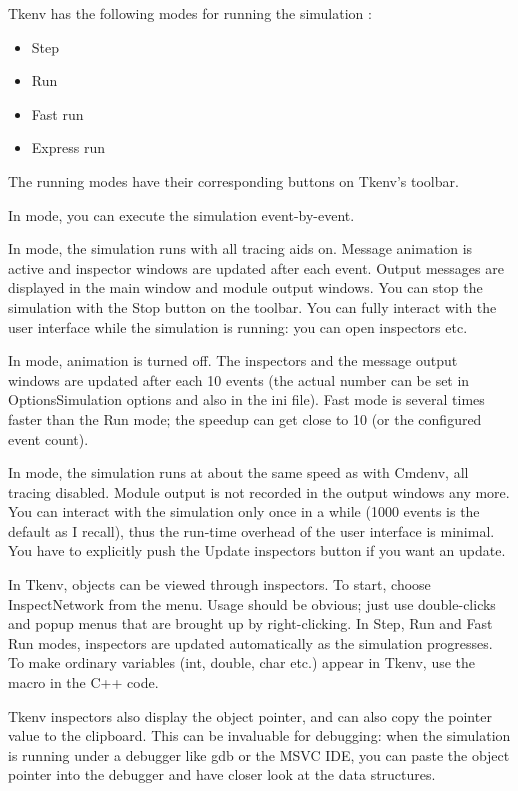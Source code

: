 

Tkenv has the following modes for running the simulation :

\begin{itemize}
   \item{Step}
   \item{Run}
   \item{Fast run}
   \item{Express run}
\end{itemize}


The running modes have their corresponding buttons on Tkenv's
toolbar.


In  mode, you can execute the simulation event-by-event.


In  mode, the simulation runs with all tracing aids on.
Message animation is active and inspector windows are updated
after each event. Output messages are displayed in the main window
and module output windows. You can stop the simulation with the
Stop button on the toolbar. You can fully interact with the user
interface while the simulation is running: you can open inspectors
etc.


In  mode, animation is turned off. The inspectors and
the message output windows are updated after each 10 events (the
actual number can be set in Options{\textbar}Simulation options and
also in the ini file). Fast mode is several times faster than
the Run mode; the speedup can get close to 10 (or the configured
event count).

In  mode, the simulation runs at about the same speed
as with Cmdenv, all tracing disabled. Module output is not recorded
in the output windows any more. You can interact with the simulation
only once in a while (1000 events is the default as I recall),
thus the run-time overhead of the user interface is minimal.
You have to explicitly push the Update inspectors button if you
want an update.




In Tkenv, objects can be viewed through inspectors. To start, choose
Inspect{\textbar}Network from the menu. Usage should be obvious; just
use double-clicks and popup menus that are brought up by
right-clicking. In Step, Run and Fast Run modes, inspectors are
updated automatically as the simulation progresses. To make ordinary
variables (int, double, char etc.) appear in Tkenv, use the
 macro in the C++ code.

Tkenv inspectors also display the object pointer, and can also copy
the pointer value to the clipboard. This can be invaluable for debugging:
when the simulation is running under a debugger like gdb or the MSVC IDE,
you can paste the object pointer into the debugger and have closer look
at the data structures.


